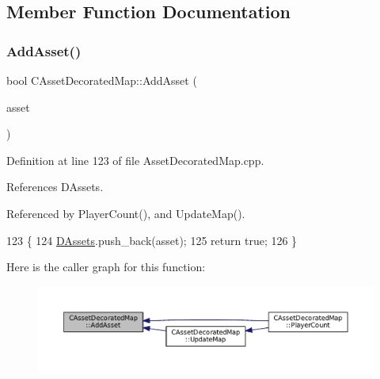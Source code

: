 \subsection{Member Function Documentation}
\hypertarget{classCAssetDecoratedMap_aaa798030159fd44251dd60aef9b00516}{}\label{classCAssetDecoratedMap_aaa798030159fd44251dd60aef9b00516} 
\subsubsection{\texorpdfstring{Add\+Asset()}{AddAsset()}}
{\footnotesize\ttfamily bool C\+Asset\+Decorated\+Map\+::\+Add\+Asset (\begin{DoxyParamCaption}\item[{std\+::shared\+\_\+ptr$<$ \hyperlink{classCPlayerAsset}{C\+Player\+Asset} $>$}]{asset }\end{DoxyParamCaption})}



Definition at line 123 of file Asset\+Decorated\+Map.\+cpp.



References D\+Assets.



Referenced by Player\+Count(), and Update\+Map().


\begin{DoxyCode}
123                                                                     \{
124     \hyperlink{classCAssetDecoratedMap_a94eeed5b16141169b1ba6cb3842055aa}{DAssets}.push\_back(asset);
125     \textcolor{keywordflow}{return} \textcolor{keyword}{true};
126 \}
\end{DoxyCode}
Here is the caller graph for this function\+:\nopagebreak
\begin{figure}[H]
\begin{center}
\leavevmode
\includegraphics[width=350pt]{classCAssetDecoratedMap_aaa798030159fd44251dd60aef9b00516_icgraph}
\end{center}
\end{figure}
\hypertarget{classCAssetDecoratedMap_aa71f42e162c1d3003248306bfa15e69d}{}\label{classCAssetDecoratedMap_aa71f42e162c1d3003248306bfa15e69d} 
